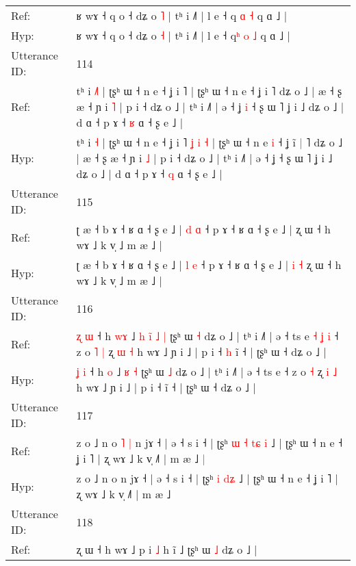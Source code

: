 \documentclass[10pt]{article}
\DeclareRobustCommand{\hl}[1]{{\textcolor{red}{#1}}}
\begin{document}
\begin{longtable}{ll}
Ref: & ʁ wɤ ˧ q o ˧ dʑ o \hl{˥} | tʰ i ˩˥ | l e ˧ q\hl{} \hl{ɑ} \hl{˧} q ɑ ˩ |
 \\
Hyp: & ʁ wɤ ˧ q o ˧ dʑ o \hl{˧} | tʰ i ˩˥ | l e ˧ q\hl{ʰ} \hl{o} \hl{˩} q ɑ ˩ |
 \\
\midrule
Utterance ID: & 114 \\
Ref: & tʰ i \hl{˩}\hl{˥} | ʈʂʰ ɯ ˧ n e ˧ ʝ i ˥\hl{}\hl{}\hl{}\hl{}\hl{}\hl{} | ʈʂʰ ɯ ˧ n e\hl{}\hl{} ˧ ʝ i\hl{}\hl{}\hl{} ˥ dʑ o ˩ | æ ˧ ʂ æ ˧ ɲ i \hl{˥} | p i ˧ dʑ o ˩ | tʰ i ˩˥ | ə ˧ ʝ\hl{ }\hl{i} ˧ ʂ ɯ ˥ ʝ i ˩ dʑ o ˩ | d ɑ ˧ p ɤ ˧ \hl{ʁ} ɑ ˧ ʂ e ˩ |
 \\
Hyp: & tʰ i \hl{}\hl{˧} | ʈʂʰ ɯ ˧ n e ˧ ʝ i ˥\hl{ }\hl{ʝ}\hl{ }\hl{i}\hl{ }\hl{˧} | ʈʂʰ ɯ ˧ n e\hl{ }\hl{i} ˧ ʝ i\hl{̃}\hl{ }\hl{|} ˥ dʑ o ˩ | æ ˧ ʂ æ ˧ ɲ i \hl{˩} | p i ˧ dʑ o ˩ | tʰ i ˩˥ | ə ˧ ʝ\hl{}\hl{} ˧ ʂ ɯ ˥ ʝ i ˩ dʑ o ˩ | d ɑ ˧ p ɤ ˧ \hl{q} ɑ ˧ ʂ e ˩ |
 \\
\midrule
Utterance ID: & 115 \\
Ref: & ʈ æ ˧ b ɤ ˧ ʁ ɑ ˧ ʂ e ˩ | \hl{d} \hl{ɑ} ˧ p ɤ ˧ ʁ ɑ ˧ ʂ e ˩ |\hl{}\hl{}\hl{}\hl{} ʐ ɯ ˧ h wɤ ˩ k v̩ ˩ m æ ˩ |
 \\
Hyp: & ʈ æ ˧ b ɤ ˧ ʁ ɑ ˧ ʂ e ˩ | \hl{l} \hl{e} ˧ p ɤ ˧ ʁ ɑ ˧ ʂ e ˩ |\hl{ }\hl{i}\hl{ }\hl{˧} ʐ ɯ ˧ h wɤ ˩ k v̩ ˩ m æ ˩ |
 \\
\midrule
Utterance ID: & 116 \\
Ref: & \hl{ʐ} \hl{ɯ} ˧ h \hl{w}\hl{ɤ} ˩\hl{ }\hl{h}\hl{ }\hl{i}\hl{̃} \hl{˩} \hl{|} ʈʂʰ ɯ \hl{˧} dʑ o ˩ | tʰ i ˩˥ | ə ˧ ts e\hl{ }\hl{˧}\hl{ }\hl{ʝ}\hl{ }\hl{i} ˧ z o\hl{ }\hl{˥} \hl{|} ʐ \hl{ɯ} \hl{˧} h wɤ ˩ ɲ i ˩ | p i ˧\hl{ }\hl{h} ĩ ˧ | ʈʂʰ ɯ ˧ dʑ o ˩ |
 \\
Hyp: & \hl{ʝ} \hl{i} ˧ h \hl{}\hl{o} ˩\hl{}\hl{}\hl{}\hl{}\hl{} \hl{ʁ} \hl{˧} ʈʂʰ ɯ \hl{˩} dʑ o ˩ | tʰ i ˩˥ | ə ˧ ts e\hl{}\hl{}\hl{}\hl{}\hl{}\hl{} ˧ z o\hl{}\hl{} \hl{˧} ʐ \hl{i} \hl{˩} h wɤ ˩ ɲ i ˩ | p i ˧\hl{}\hl{} ĩ ˧ | ʈʂʰ ɯ ˧ dʑ o ˩ |
 \\
\midrule
Utterance ID: & 117 \\
Ref: & z o ˩ n o\hl{ }\hl{˥}\hl{ }\hl{|} n jɤ ˧ | ə ˧ s i ˧ | ʈʂʰ\hl{ }\hl{ɯ} \hl{˧} \hl{t}\hl{ɕ}\hl{ }\hl{i} ˩ | ʈʂʰ ɯ ˧ n e ˧ ʝ i ˥ | ʐ wɤ ˩ k v̩ ˩˥ | m æ ˩\hl{ }\hl{|}
 \\
Hyp: & z o ˩ n o\hl{}\hl{}\hl{}\hl{} n jɤ ˧ | ə ˧ s i ˧ | ʈʂʰ\hl{}\hl{} \hl{i} \hl{}\hl{}\hl{d}\hl{ʑ} ˩ | ʈʂʰ ɯ ˧ n e ˧ ʝ i ˥ | ʐ wɤ ˩ k v̩ ˩˥ | m æ ˩\hl{}\hl{}
 \\
\midrule
Utterance ID: & 118 \\
Ref: & ʐ ɯ ˧ h wɤ ˩\hl{}\hl{} p i \hl{˩} h ĩ ˩ ʈʂʰ ɯ \hl{˩} dʑ o ˩ |

\end{longtable}
\end{document}
